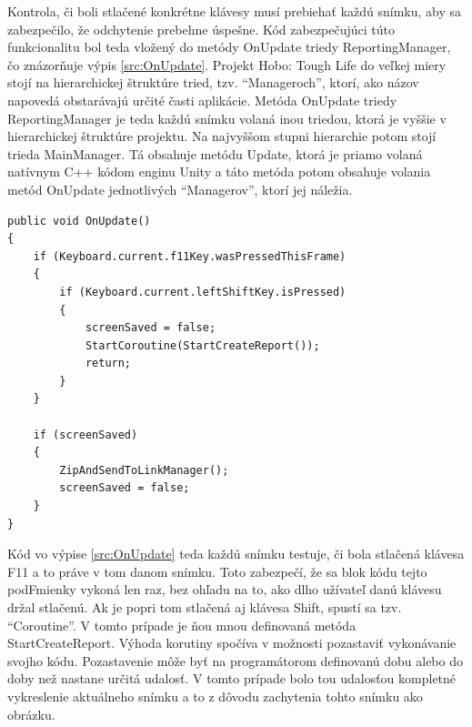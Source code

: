 \documentclass[slovak,bachelorpractice]{diploma}
\begin{document}
Kontrola, či boli stlačené konkrétne klávesy musí prebiehať každú snímku, aby sa zabezpečilo, že odchytenie prebehne úspešne. Kód zabezpečujúci túto funkcionalitu bol teda vložený do metódy OnUpdate triedy ReportingManager, čo znázorňuje výpis \ref{src:OnUpdate}. Projekt Hobo: Tough Life do veľkej miery stojí na hierarchickej štruktúre tried, tzv. \enquote{Manageroch}, ktorí, ako názov napovedá obstarávajú určité časti aplikácie. Metóda OnUpdate triedy ReportingManager je teda každú snímku volaná inou triedou, ktorá je vyššie v hierarchickej štruktúre projektu. Na najvyššom stupni hierarchie potom stojí trieda MainManager. Tá obsahuje metódu Update, ktorá je priamo volaná natívnym C++ kódom enginu Unity a táto metóda potom obsahuje volania metód OnUpdate jednotlivých \enquote{Managerov}, ktorí jej náležia.
\vspace{10pt}
\begin{lstlisting}[label=src:OnUpdate,caption={Metóda OnUpdate triedy ReportingManager}]
public void OnUpdate()
{
    if (Keyboard.current.f11Key.wasPressedThisFrame)
    {
        if (Keyboard.current.leftShiftKey.isPressed)
        {
            screenSaved = false;
            StartCoroutine(StartCreateReport());
            return;
        }
    }

    if (screenSaved)
    {
        ZipAndSendToLinkManager();
        screenSaved = false;
    }
}
\end{lstlisting}

Kód vo výpise \ref{src:OnUpdate} teda každú snímku testuje, či bola stlačená klávesa F11 a to práve v tom danom snímku. Toto zabezpečí, že sa blok kódu tejto podFmienky vykoná len raz, bez ohľadu na to, ako dlho užívateľ danú klávesu držal stlačenú. Ak je popri tom stlačená aj klávesa Shift, spustí sa tzv. \enquote{Coroutine}. V tomto prípade je ňou mnou definovaná metóda StartCreateReport. Výhoda korutiny spočíva v možnosti pozastaviť vykonávanie svojho kódu. Pozastavenie môže byť na programátorom definovanú dobu alebo do doby než nastane určitá udalosť. V tomto prípade bolo tou udalosťou kompletné vykreslenie aktuálneho snímku a to z dôvodu zachytenia tohto snímku ako obrázku.
\end{document}
